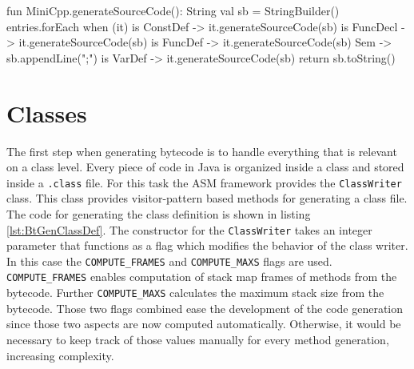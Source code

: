 \begin{KotlinCode}[float,numbers=none,caption=Implementation of the \texttt{generateSourceCode} method for the \texttt{MiniCpp} class., label=lst:SrcGenMiniCpp]
fun MiniCpp.generateSourceCode(): String {
    val sb = StringBuilder()
    entries.forEach {
        when (it) {
            is ConstDef -> it.generateSourceCode(sb)
            is FuncDecl -> it.generateSourceCode(sb)
            is FuncDef -> it.generateSourceCode(sb)
            Sem -> sb.appendLine(";")
            is VarDef -> it.generateSourceCode(sb)
        }
    }
    return sb.toString()
}
\end{KotlinCode}
    


\section{Classes}

The first step when generating bytecode is to handle everything that is relevant on a class level. Every piece of code in Java is organized inside a class and stored inside a \verb|.class| file. For this task the ASM framework provides the \verb|ClassWriter| class. This class provides visitor-pattern based methods for generating a class file. The code for generating the class definition is shown in listing \ref{lst:BtGenClassDef}. The constructor for the \verb|ClassWriter| takes an integer parameter that functions as a flag which modifies the behavior of the class writer. In this case the \verb|COMPUTE_FRAMES| and  \verb|COMPUTE_MAXS| flags are used. \verb|COMPUTE_FRAMES| enables computation of stack map frames of methods from the bytecode. Further \verb|COMPUTE_MAXS| calculates the maximum stack size from the bytecode. Those two flags combined ease the development of the code generation since those two aspects are now computed automatically. Otherwise, it would be necessary to keep track of those values manually for every method generation, increasing complexity. 

